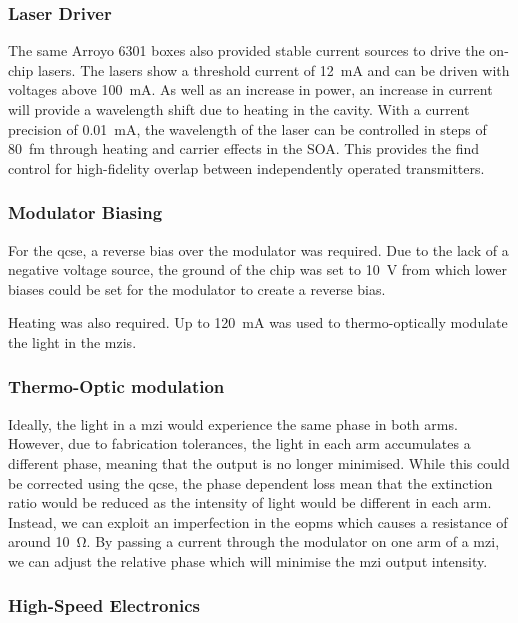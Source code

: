 \subsubsection*{Laser Driver}

The same Arroyo 6301 boxes also provided stable current sources to drive the on-chip lasers. The lasers show a threshold current of \SI{12}{mA} and can be driven with voltages above \SI{100}{mA}. As well as an increase in power, an increase in current will provide a wavelength shift due to heating in the cavity. With a current precision of \SI{0.01}{mA}, the wavelength of the laser can be controlled in steps of \SI{80}{fm} through heating and carrier effects in the \ac{SOA}. This provides the find control for high-fidelity overlap between independently operated transmitters. 

\subsubsection*{Modulator Biasing}

For the \ac{qcse}, a reverse bias over the modulator was required. Due to the lack of a negative voltage source, the ground of the chip was set to \SI{10}{V} from which lower biases could be set for the modulator to create a reverse bias.

Heating was also required. Up to \SI{120}{mA} was used to thermo-optically modulate the light in the \acp{mzi}.

\subsubsection*{Thermo-Optic modulation}

Ideally, the light in a \ac{mzi} would experience the same phase in both arms. However, due to fabrication tolerances, the light in each arm accumulates a different phase, meaning that the output is no longer minimised. While this could be corrected using the \ac{qcse}, the phase dependent loss mean that the extinction ratio would be reduced as the intensity of light would be different in each arm. Instead, we can exploit an imperfection in the \acp{eopm} which causes a resistance of around \SI{10}{\ohm}. By passing a current through the modulator on one arm of a \ac{mzi}, we can adjust the relative phase which will minimise the \ac{mzi} output intensity.

\subsubsection*{High-Speed Electronics}

